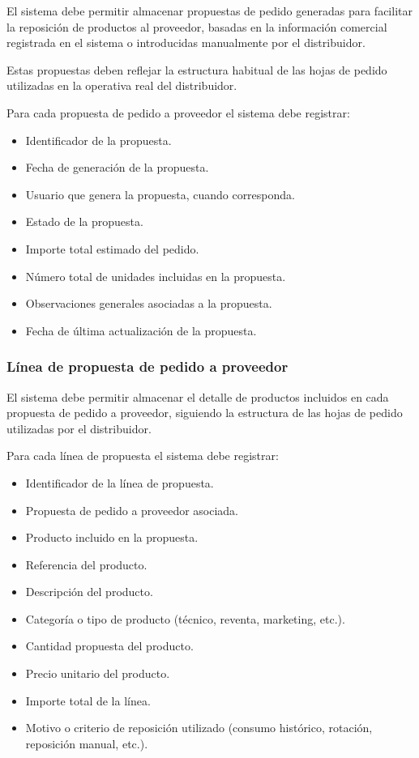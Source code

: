 El sistema debe permitir almacenar propuestas de pedido generadas para facilitar la reposición de productos al proveedor, basadas en la información comercial registrada en el sistema o introducidas manualmente por el distribuidor.

Estas propuestas deben reflejar la estructura habitual de las hojas de pedido utilizadas en la operativa real del distribuidor.

Para cada propuesta de pedido a proveedor el sistema debe registrar:

\begin{itemize}

    \item Identificador de la propuesta.
    \item Fecha de generación de la propuesta.
    \item Usuario que genera la propuesta, cuando corresponda.
    \item Estado de la propuesta.
    \item Importe total estimado del pedido.
    \item Número total de unidades incluidas en la propuesta.
    \item Observaciones generales asociadas a la propuesta.
    \item Fecha de última actualización de la propuesta.

\end{itemize}

\subsubsection*{Línea de propuesta de pedido a proveedor}

El sistema debe permitir almacenar el detalle de productos incluidos en cada propuesta de pedido a proveedor, siguiendo la estructura de las hojas de pedido utilizadas por el distribuidor.

Para cada línea de propuesta el sistema debe registrar:

\begin{itemize}

    \item Identificador de la línea de propuesta.
    \item Propuesta de pedido a proveedor asociada.
    \item Producto incluido en la propuesta.
    \item Referencia del producto.
    \item Descripción del producto.
    \item Categoría o tipo de producto (técnico, reventa, marketing, etc.).
    \item Cantidad propuesta del producto.
    \item Precio unitario del producto.
    \item Importe total de la línea.
    \item Motivo o criterio de reposición utilizado (consumo histórico, rotación, reposición manual, etc.).

\end{itemize}

